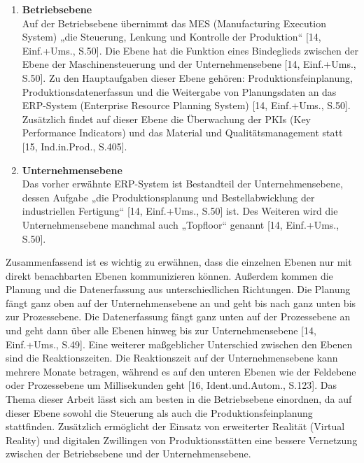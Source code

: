 \begin{enumerate}
	\item \textbf{Betriebsebene}\\
	Auf der Betriebsebene übernimmt das MES (Manufacturing Execution System) „die Steuerung, Lenkung und Kontrolle der Produktion“ [14, Einf.+Ums., S.50]. Die Ebene hat die Funktion eines Bindeglieds zwischen der Ebene der Maschinensteuerung und der Unternehmensebene [14, Einf.+Ums., S.50]. Zu den Hauptaufgaben dieser Ebene gehören: Produktionsfeinplanung, Produktionsdatenerfassun und die Weitergabe von Planungsdaten an das ERP-System (Enterprise Resource Planning System) [14, Einf.+Ums., S.50].  Zusätzlich findet auf dieser Ebene die Überwachung der PKIs (Key Performance Indicators) und das Material und Qualitätsmanagement statt [15, Ind.in.Prod., S.405].
	\item \textbf{Unternehmensebene}\\
	Das vorher erwähnte ERP-System ist Bestandteil der Unternehmensebene, dessen Aufgabe „die Produktionsplanung und Bestellabwicklung der industriellen Fertigung“ [14, Einf.+Ums., S.50] ist. Des Weiteren wird die Unternehmensebene manchmal auch „Topfloor“ genannt [14, Einf.+Ums., S.50].
\end{enumerate}
Zusammenfassend ist es wichtig zu erwähnen, dass die einzelnen Ebenen nur mit direkt benachbarten Ebenen kommunizieren können. Außerdem kommen die Planung und die Datenerfassung aus unterschiedlichen Richtungen. Die Planung fängt ganz oben auf der Unternehmensebene an und geht bis nach ganz unten bis zur Prozessebene. Die Datenerfassung fängt ganz unten auf der Prozessebene an und geht dann über alle Ebenen hinweg bis zur Unternehmensebene [14, Einf.+Ums., S.49]. Eine weiterer maßgeblicher Unterschied zwischen den Ebenen sind die Reaktionszeiten. Die Reaktionszeit auf der Unternehmensebene kann mehrere Monate betragen, während es auf den unteren Ebenen wie der Feldebene oder Prozessebene um Millisekunden geht [16, Ident.und.Autom., S.123].
\newline\newline
Das Thema dieser Arbeit lässt sich am besten in die Betriebsebene einordnen, da auf dieser Ebene sowohl die Steuerung als auch die Produktionsfeinplanung stattfinden. Zusätzlich ermöglicht der Einsatz von erweiterter Realität (Virtual Reality) und digitalen Zwillingen von Produktionsstätten eine bessere Vernetzung zwischen der Betriebsebene und der Unternehmensebene.

